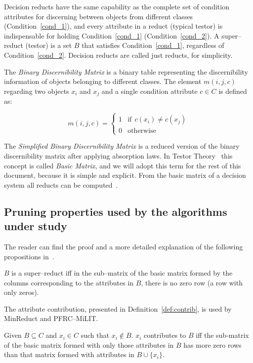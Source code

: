 \documentclass[citenumber]{llncs}
\begin{document}
	Decision reducts have the same capability as the complete set of condition attributes for discerning between objects from different classes (Condition~\ref{cond_1}), and every attribute in a reduct (typical testor) is indispensable for holding Condition~\ref{cond_1} (Condition~\ref{cond_2}). A super--reduct (testor) is a set $B$ that satisfies Condition~\ref{cond_1}, regardless of Condition~\ref{cond_2}. Decision reducts are called just reducts, for simplicity.

	The \textit{Binary Discernibility Matrix} is a binary table representing the discernibility information of objects belonging to different classes. The element $m(i, j, c)$ regarding two objects $x_i$ and $x_j$ and a single condition attribute $c \in C$ is defined as:

	\begin{equation*}
		m(i, j, c)=\left\lbrace\begin{array}{cl}
		1 & \mathrm{if~~}c(x_i) \neq c(x_j) \\
		0 								   & \mathrm{otherwise} 
		\end{array}\right.
	\end{equation*} 

	The \textit{Simplified Binary Discernibility Matrix} is a reduced version of the binary discernibility matrix after applying absorption laws. In Testor Theory~\cite{Lazo01} this concept is called \textit{Basic Matrix}, and we will adopt this term for the rest of this document, because it is simple and explicit. From the basic matrix of a decision system all reducts can be computed~\cite{Yao09}.

%	
\subsection{Pruning properties used by the algorithms under study}
%
	The reader can find the proof and a more detailed explanation of the following propositions in~\cite{rodriguez20,Piza20}. 
	
	\begin{definition}\label{def:testor}
		$B$ is a super--reduct iff in the sub--matrix of the basic matrix formed by the columns corresponding to the attributes in $B$, there is no zero row (a row with only zeros).
	\end{definition}
	
	The attribute contribution, presented in Definition~\ref{def:contrib}, is used by MinReduct and PFRC--MiLIT. 	
	
	\begin{definition}\label{def:contrib}
		Given $B \subseteq C$ and $x_i \in C$ such that $x_i \notin B$. $x_i$ contributes to $B$ iff the sub-matrix of the basic matrix formed with only those attributes in $B$ has more zero rows than that matrix formed with attributes in $B \cup \lbrace x_i \rbrace$.
	\end{definition}	
	
\end{document}
